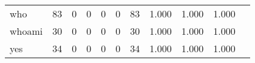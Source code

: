 \begin{longtable}{lp{1.20cm}p{1.20cm}p{1.20cm}p{1.20cm}p{1.20cm}p{1.20cm}p{1.20cm}p{1.20cm}p{1.20cm}p{1.20cm}}
who       &                                    83 &                                                  0 &                                                  0 &                                                  0 &                                                  0 &                                                 83 &                                         1.000 &                                              1.000 &                                              1.000 \\
whoami    &                                    30 &                                                  0 &                                                  0 &                                                  0 &                                                  0 &                                                 30 &                                         1.000 &                                              1.000 &                                              1.000 \\
yes       &                                    34 &                                                  0 &                                                  0 &                                                  0 &                                                  0 &                                                 34 &                                         1.000 &                                              1.000 &                                              1.000 \\
\end{longtable}
